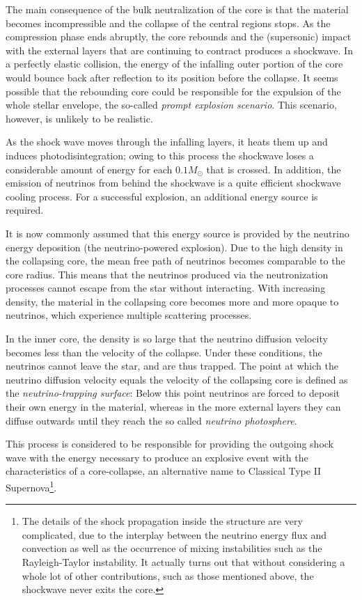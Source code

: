 The main consequence of the bulk neutralization of the core is that the material becomes incompressible and the collapse of the central regions stops. As the compression phase ends abruptly, the core rebounds and the (supersonic) impact with the external layers that are continuing to contract produces a shockwave. In a perfectly elastic collision, the energy of the infalling outer portion of the core would bounce back after reflection to its position before the collapse. It seems possible that the rebounding core could be responsible for the expulsion of the whole stellar envelope, the so-called \emph{prompt explosion scenario}. This scenario, however, is unlikely to be realistic.
\par As the shock wave moves through the infalling layers, it heats them up and induces photodisintegration; owing to this process the shockwave loses a considerable amount of energy for each $0.1M_{\odot}$ that is crossed. In addition, the emission of neutrinos from behind the shockwave is a quite efficient shockwave cooling process. For a successful explosion, an additional energy source is required.
\par It is now commonly assumed that this energy source is provided by the neutrino energy deposition (the neutrino-powered explosion). Due to the high density in the collapsing core, the mean free path of neutrinos becomes comparable to the core radius. This means that the neutrinos produced via the neutronization processes cannot escape from the star without interacting. With increasing density, the material in the collapsing core becomes more and more opaque to neutrinos, which experience multiple scattering processes.
\par In the inner core, the density is so large that the neutrino diffusion velocity becomes less than the velocity of the collapse. Under these conditions, the neutrinos cannot leave the star, and are thus trapped. The point at which the neutrino diffusion velocity equals the velocity of the collapsing core is defined as the \emph{neutrino-trapping surface}: Below this point neutrinos are forced to deposit their own energy in the material, whereas in the more external layers they can diffuse outwards until they reach the so called \emph{neutrino photosphere}.
\par This process is considered to be responsible for providing the outgoing shock wave with the energy necessary to produce an explosive event with the characteristics of a core-collapse, an alternative name to Classical Type II Supernova\footnote{The details of the shock propagation inside the structure are very complicated, due to the interplay between the neutrino energy flux and convection as well as the occurrence of mixing instabilities such as the Rayleigh-Taylor instability. It actually turns out that without considering a whole lot of other contributions, such as those mentioned above, the shockwave never exits the core.}.
